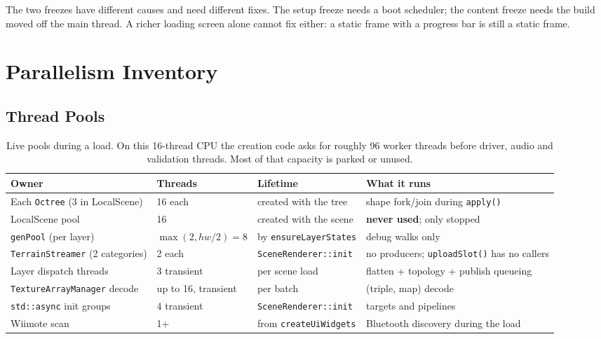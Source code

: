 \documentclass[11pt,a4paper]{article}
\begin{document}
The two freezes have different causes and need different fixes. The setup
freeze needs a boot scheduler; the content freeze needs the build moved off
the main thread. A richer loading screen alone cannot fix either: a static
frame with a progress bar is still a static frame.

\section{Parallelism Inventory}

\subsection{Thread Pools}

\begin{table}[h]
\centering
\small
\begin{tabular}{@{}L{3.7cm}L{2.6cm}L{3.6cm}L{4.7cm}@{}}
\toprule
\textbf{Owner} & \textbf{Threads} & \textbf{Lifetime} & \textbf{What it runs} \\
\midrule
Each \texttt{Octree} (3 in LocalScene) & 16 each & created with the tree & shape fork/join during \texttt{apply()} \\
LocalScene pool & 16 & created with the scene & \textbf{never used}; only stopped \\
\texttt{genPool} (per layer) & $\max(2, hw/2)=8$ & by \texttt{ensureLayerStates} & debug walks only \\
\texttt{TerrainStreamer} (2 categories) & 2 each & \texttt{SceneRenderer::init} & no producers; \texttt{uploadSlot()} has no callers \\
Layer dispatch threads & 3 transient & per scene load & flatten + topology + publish queueing \\
\texttt{TextureArrayManager} decode & up to 16, transient & per batch & (triple, map) decode \\
\texttt{std::async} init groups & 4 transient & \texttt{SceneRenderer::init} & targets and pipelines \\
Wiimote scan & 1+ & from \texttt{createUiWidgets} & Bluetooth discovery during the load \\
\bottomrule
\end{tabular}
\caption{Live pools during a load. On this 16-thread CPU the creation code
asks for roughly 96 worker threads before driver, audio and validation
threads. Most of that capacity is parked or unused.}
\end{table}
\end{document}
